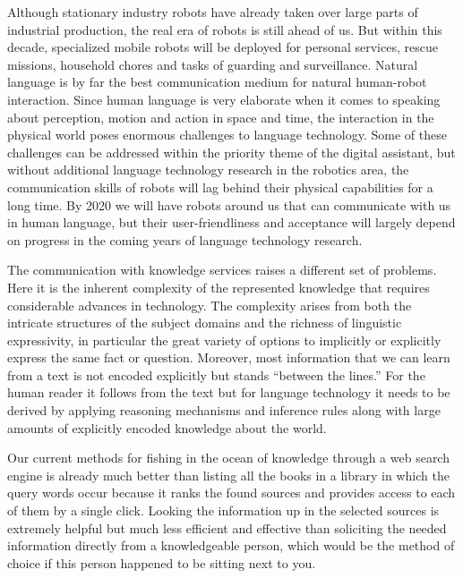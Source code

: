\begin{multicols}{2}
Although stationary industry robots have already taken over large parts of industrial production, the real era of robots is still ahead of us. But within this decade, specialized mobile robots will be deployed for personal services, rescue missions, household chores and tasks of guarding and surveillance. Natural language is by far the best communication medium for natural human-robot interaction. Since human language is very elaborate when it comes to speaking about perception, motion and action in space and time, the interaction in the physical world poses enormous challenges to language technology. Some of these challenges can be addressed within the priority theme of the digital assistant, but without additional language technology research in the robotics area, the communication skills of robots will lag behind their physical capabilities for a long time. By 2020 we will have robots around us that can communicate with us in human language, but their user-friendliness and acceptance will largely depend on progress in the coming years of language technology research.
 
The communication with knowledge services raises a different set of problems. Here it is the inherent complexity of the represented knowledge that requires considerable advances in technology. The complexity arises from both the intricate structures of the subject domains and the richness of linguistic expressivity, in particular the great variety of options to implicitly or explicitly express the same fact or question. Moreover, most information that we can learn from a text is not encoded explicitly but stands “between the lines.” For the human reader it follows from the text but for language technology it needs to be derived by applying reasoning mechanisms and inference rules along with large amounts of explicitly encoded knowledge about the world. 
 
Our current methods for fishing in the ocean of knowledge through a web search engine is already much better than listing all the books in a library in which the query words occur because it ranks the found sources and provides access to each of them by a single click. Looking the information up in the selected sources is extremely helpful but much less efficient and effective than soliciting the needed information directly from a knowledgeable person, which would be the method of choice if this person happened to be sitting next to you.
 

\end{multicols}
